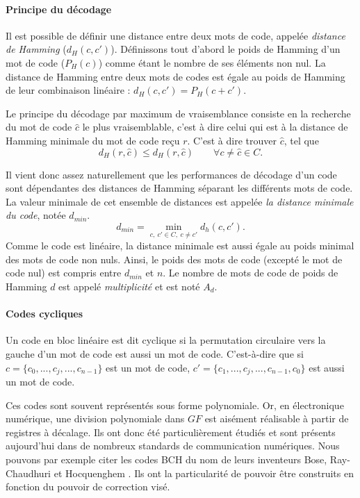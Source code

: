 \paragraph*{Principe du décodage}
Il est possible de définir une distance entre deux mots de code, appelée \emph{distance de Hamming} ($d_H(c, c')$). 
Définissons tout d'abord le poids de Hamming d'un mot de code ($P_H(c)$) comme étant le nombre de ses éléments non nul. 
La distance de Hamming entre deux mots de codes est égale au poids de Hamming de leur combinaison linéaire : 
$d_H(c, c') = P_H(c+c')$.

Le principe du décodage par maximum de vraisemblance consiste en la recherche du mot de code $\hat{c}$ le plus 
vraisemblable, c'est à dire celui qui est à la distance de Hamming minimale du mot de code reçu $r$. C'est à dire trouver 
$\hat{c}$, tel que \[d_H(r,\hat{c}) \leq d_H(r,\hat{c})\qquad \forall c \neq \hat{c} \in C.\]

Il vient donc assez naturellement que les performances de décodage d'un code sont dépendantes des distances de Hamming 
séparant les différents mots de code. La valeur minimale de cet ensemble de distances est appelée \emph{la distance minimale du code}, 
notée $d_{min}$. \[d_{min}=\min\limits_{c,~c'\in C,~c\ne c'}d_h(c, c').\] Comme le code est linéaire, la distance minimale 
est aussi égale au poids minimal des mots de code non nuls. Ainsi, le poids des mots de code (excepté le mot 
de code nul) est compris entre $d_{min}$ et $n$. Le nombre de mots de code de poids de Hamming $d$ est appelé 
\emph{multiplicité} et est noté $A_d$.

\paragraph*{Codes cycliques} Un code en bloc linéaire est dit cyclique si la permutation circulaire vers la 
gauche d'un mot de code est aussi un mot de code. C'est-à-dire que si $c = \{c_0, ..., c_j, ..., c_{n-1}\}$ est un mot 
de code, $c' = \{c_1, ..., c_j, ..., c_{n-1}, c_0\}$ est aussi un mot de code.

Ces codes sont souvent représentés sous forme polynomiale. Or, en électronique numérique, une division polynomiale dans $GF$ est aisément 
réalisable à partir de registres à décalage. Ils ont donc été particulièrement étudiés et sont présents aujourd'hui dans 
de nombreux standards de communication numériques. Nous pouvons par exemple citer les codes BCH du nom de leurs inventeurs Bose, 
Ray-Chaudhuri et Hocquenghem \cite{bose1960class}. Ils ont la particularité de pouvoir être construits en fonction du pouvoir 
de correction visé.

